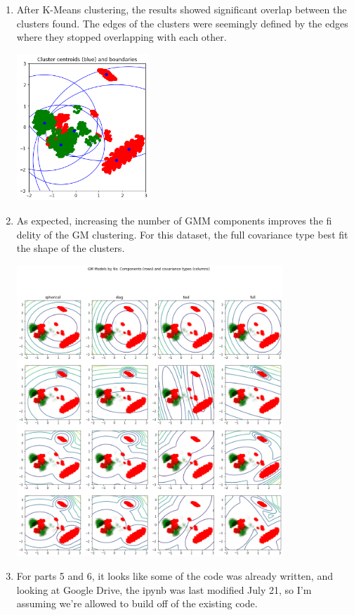 \documentclass{article}
\begin{document}
\begin{enumerate}[start=1]
\item %
    After K-Means clustering, the results showed significant overlap between the clusters found. The edges of the clusters were seemingly defined by the edges where they stopped overlapping with each other.
    
    \begin{center}
    \includegraphics[width=5cm]{part3.0.png}
    \end{center}
    
\newpage

\item %
    As expected, increasing the number of GMM components improves the fi delity of the GM clustering. For this dataset, the full covariance type best fit the shape of the clusters.
    
    \begin{center}
    \includegraphics[width=10cm]{part4.0.png}
    \end{center}

\item %
    For parts 5 and 6, it looks like some of the code was already written, and looking at Google Drive, the ipynb was last modified July 21, so I'm assuming we're allowed to build off of the existing code.
    

\end{enumerate}
\end{document}
